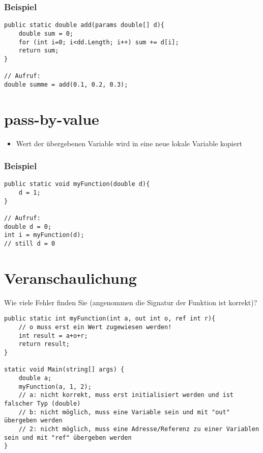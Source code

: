 \subsubsection*{Beispiel}
\begin{lstlisting}[language={[Sharp]C}]
public static double add(params double[] d){
	double sum = 0; 
	for (int i=0; i<dd.Length; i++) sum += d[i];
	return sum;
}

// Aufruf: 
double summe = add(0.1, 0.2, 0.3);
\end{lstlisting}
\section{pass-by-value}
\begin{itemize}
\item Wert der übergebenen Variable wird in eine neue lokale Variable kopiert
\end{itemize}
\subsubsection*{Beispiel}
\begin{lstlisting}[language={[Sharp]C}]
public static void myFunction(double d){
	d = 1;
}

// Aufruf: 
double d = 0;
int i = myFunction(d);
// still d = 0 
\end{lstlisting}

\section{Veranschaulichung}
Wie viele Fehler finden Sie (angenommen die Signatur der Funktion ist korrekt)?
\begin{lstlisting}[language={[Sharp]C}]
public static int myFunction(int a, out int o, ref int r){ 
	// o muss erst ein Wert zugewiesen werden!
	int result = a+o+r; 
	return result; 
} 

static void Main(string[] args) { 
	double a; 
	myFunction(a, 1, 2);
	// a: nicht korrekt, muss erst initialisiert werden und ist falscher Typ (double)
	// b: nicht möglich, muss eine Variable sein und mit "out" übergeben werden
	// 2: nicht möglich, muss eine Adresse/Referenz zu einer Variablen sein und mit "ref" übergeben werden
}
\end{lstlisting}
